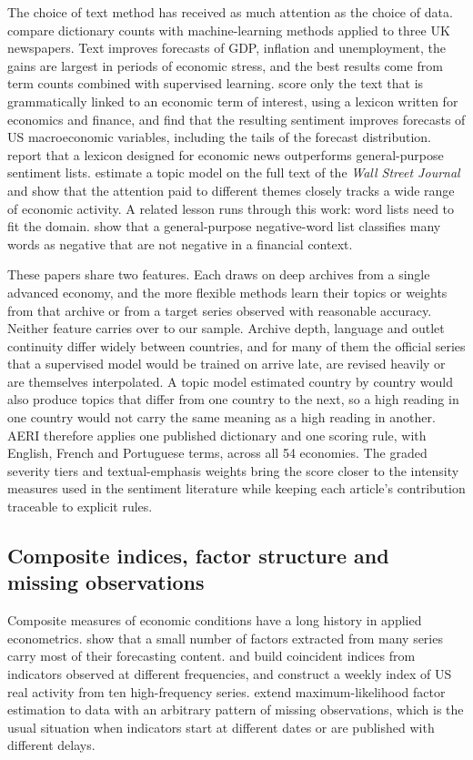 \documentclass[12pt]{article}
\begin{document}
The choice of text method has received as much attention as the choice of data. \citet{kalamara2022} compare dictionary counts with machine-learning methods applied to three UK newspapers. Text improves forecasts of GDP, inflation and unemployment, the gains are largest in periods of economic stress, and the best results come from term counts combined with supervised learning. \citet{barbaglia2023} score only the text that is grammatically linked to an economic term of interest, using a lexicon written for economics and finance, and find that the resulting sentiment improves forecasts of US macroeconomic variables, including the tails of the forecast distribution. \citet{shapiro2022} report that a lexicon designed for economic news outperforms general-purpose sentiment lists. \citet{bybee2024} estimate a topic model on the full text of the \textit{Wall Street Journal} and show that the attention paid to different themes closely tracks a wide range of economic activity. A related lesson runs through this work: word lists need to fit the domain. \citet{loughran2011} show that a general-purpose negative-word list classifies many words as negative that are not negative in a financial context.

These papers share two features. Each draws on deep archives from a single advanced economy, and the more flexible methods learn their topics or weights from that archive or from a target series observed with reasonable accuracy. Neither feature carries over to our sample. Archive depth, language and outlet continuity differ widely between countries, and for many of them the official series that a supervised model would be trained on arrive late, are revised heavily or are themselves interpolated. A topic model estimated country by country would also produce topics that differ from one country to the next, so a high reading in one country would not carry the same meaning as a high reading in another. AERI therefore applies one published dictionary and one scoring rule, with English, French and Portuguese terms, across all 54 economies. The graded severity tiers and textual-emphasis weights bring the score closer to the intensity measures used in the sentiment literature while keeping each article's contribution traceable to explicit rules.
\subsection{Composite indices, factor structure and missing observations}\label{sec:literature_composite}
Composite measures of economic conditions have a long history in applied econometrics. \citet{stockwatson2002} show that a small number of factors extracted from many series carry most of their forecasting content. \citet{mariano2003} and \citet{aruoba2009} build coincident indices from indicators observed at different frequencies, and \citet{lewis2022} construct a weekly index of US real activity from ten high-frequency series. \citet{banbura2014} extend maximum-likelihood factor estimation to data with an arbitrary pattern of missing observations, which is the usual situation when indicators start at different dates or are published with different delays.
\end{document}
